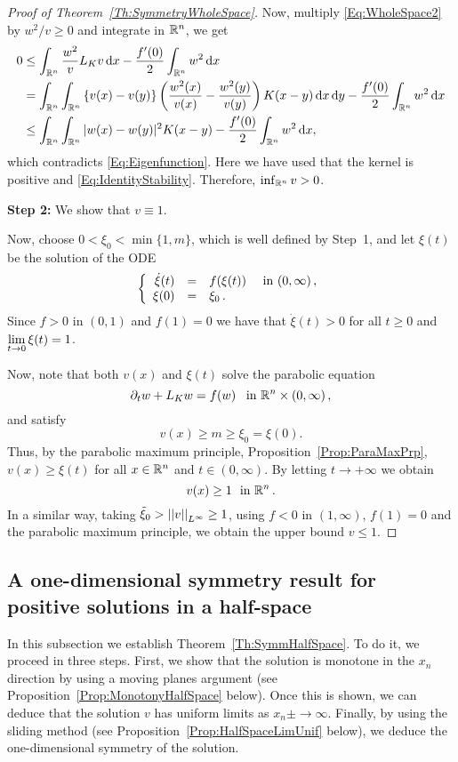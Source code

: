 \begin{proof}[Proof of Theorem~\ref{Th:SymmetryWholeSpace}]
Now, multiply \eqref{Eq:WholeSpace2} by $w^2/v\geq 0$ and integrate in $\mathbb{R}^n$, we get
\begin{align*}
0 &\leq \int_{\mathbb{R}^n} \frac{w^2}{v}  L_K v \,\mathrm{d} x - \frac{f'(0)}{2}\int_{\mathbb{R}^n} w^2 \,\mathrm{d} x \\
&= \int_{\mathbb{R}^n}\int_{\mathbb{R}^n}\left\{ v(x)-v(y) \right\} \left( \frac{w^2(x)}{v(x)}-\frac{w^2(y)}{v(y)} \right) K(x-y) \,\mathrm{d} x \,\mathrm{d} y - \frac{f'(0)}{2}\int_{\mathbb{R}^n} w^2 \,\mathrm{d} x \\
&\leq \int_{\mathbb{R}^n}\int_{\mathbb{R}^n} |w(x)-w(y)|^2 K(x-y) - \frac{f'(0)}{2}\int_{\mathbb{R}^n} w^2 \,\mathrm{d} x ,
\end{align*}
which contradicts \eqref{Eq:Eigenfunction}. Here we have used that the kernel is positive and \eqref{Eq:IdentityStability}. Therefore, $\inf_{\mathbb{R}^n} v >0$.

\textbf{Step 2:} We show that $v\equiv 1$.

Now, choose $0<\xi_0<\min\{1,m\}$, which is well defined by Step~1, and let $\xi(t)$ be the solution of the ODE
$$
\left\{\begin{array}{rcll}
\dot{\xi}(t) &=& f(\xi(t)) & \textrm{ in }(0,\infty)\,,\\
\xi(0) &=& \xi_0\,.
\end{array} \right.
$$
Since $f>0$ in $(0,1)$ and $f(1) = 0$ we have that $\dot{\xi}(t)>0$ for all $t\geq 0$ and $\displaystyle \lim_{t\to 0} \xi(t) = 1$.

Now, note that both $v(x)$ and $\xi(t)$ solve the parabolic equation
$$ \partial_t w + L_K w = f(w) \,\,\, \textrm{ in }\mathbb{R}^n\times (0,\infty)\,, $$
and satisfy
$$ v(x) \geq m \geq \xi_0 = \xi(0). $$
Thus, by the parabolic maximum principle, Proposition~\ref{Prop:ParaMaxPrp}, $v(x)\geq \xi(t)$ for all $x\in\mathbb{R}^n$ and $t\in(0,\infty)$. By letting $t \to +\infty$ we obtain
$$ v(x) \geq 1 \,\, \textrm{ in }\mathbb{R}^n\,.  $$
In a similar way, taking $\tilde{\xi}_0>\left | \left |{v} \right | \right |_{L^\infty} \geq 1$, using $f<0$ in $(1,\infty)$, $f(1)=0$ and the parabolic maximum principle, we obtain the upper bound $v\leq 1$.

\end{proof}



\subsection{A one-dimensional symmetry result for positive solutions in a half-space}

In this subsection we establish Theorem~\ref{Th:SymmHalfSpace}. To do it, we proceed in three steps. First, we show that the solution is monotone in the $x_n$ direction by using a moving planes argument (see Proposition~\ref{Prop:MonotonyHalfSpace} below). Once this is shown, we can deduce that the solution $v$ has uniform limits as $x_n\pm\to \infty$. Finally, by using the sliding method (see Proposition~\ref{Prop:HalfSpaceLimUnif} below), we deduce the one-dimensional symmetry of the solution.

